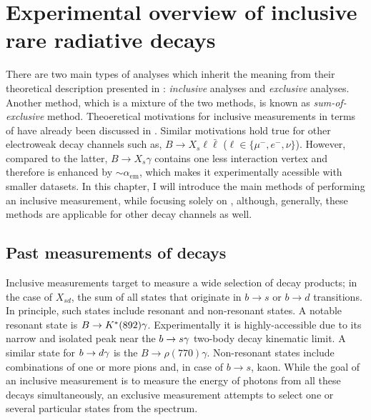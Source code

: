 \chapter{Experimental overview of inclusive rare radiative decays}

There are two main types of analyses which inherit the meaning from their theoretical description presented in : \textit{inclusive} analyses and \textit{exclusive} analyses.
Another method, which is a mixture of the two methods, is known as \textit{sum-of-exclusive} method.
Theoeretical motivations for inclusive measurements in terms of \BtoXsgamma have already been discussed in .
Similar motivations hold true for other electroweak decay channels such as, $B\to X_s\ell\bar{\ell}$ ($\ell\in\{\mu^-,e^-,\nu\}$).
However, compared to the latter, $B\rightarrow X_s\gamma$ contains one less interaction vertex and therefore is enhanced by $\sim\alpha_{\mathrm{em}}$, which makes it experimentally acessible with smaller datasets.
In this chapter, I will introduce the main methods of performing an inclusive measurement, while focusing solely on \BtoXsgamma, although, generally, these methods are applicable for other decay channels as well.

\section{Past measurements of \safeBtoXsgamma decays}

Inclusive measurements target to measure a wide selection of decay products; in the case of $X_{sd}$, the sum of all states that originate in $b\to s$ or $b\to d$ transitions.
In principle, such states include resonant and non-resonant states.
A notable resonant state is $B\rightarrow K^*(892)\gamma$.
Experimentally it is highly-accessible due to its narrow and isolated peak near the $b\rightarrow s\gamma$ two-body decay kinematic limit.
A similar state for $b\rightarrow d\gamma$ is the $B\rightarrow \rho(770)\gamma$.
Non-resonant states include combinations of one or more pions and, in case of $b\rightarrow s$, kaon.
While the goal of an inclusive measurement is to measure the energy of photons from all these decays simultaneously, an exclusive measurement attempts to select one or several particular states from the spectrum.

